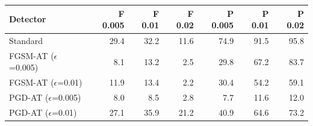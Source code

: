 \begin{tabular}{lrrrrrr}
\toprule
Detector & F 0.005 & F 0.01 & F 0.02 & P 0.005 & P 0.01 & P 0.02 \\
\midrule
Standard & 29.4 & 32.2 & 11.6 & 74.9 & 91.5 & 95.8 \\
FGSM-AT ($\epsilon$=0.005) & 8.1 & 13.2 & 2.5 & 29.8 & 67.2 & 83.7 \\
FGSM-AT ($\epsilon$=0.01) & 11.9 & 13.4 & 2.2 & 30.4 & 54.2 & 59.1 \\
PGD-AT ($\epsilon$=0.005) & 8.0 & 8.5 & 2.8 & 7.7 & 11.6 & 12.0 \\
PGD-AT ($\epsilon$=0.01) & 27.1 & 35.9 & 21.2 & 40.9 & 64.6 & 73.2 \\
\bottomrule
\end{tabular}
